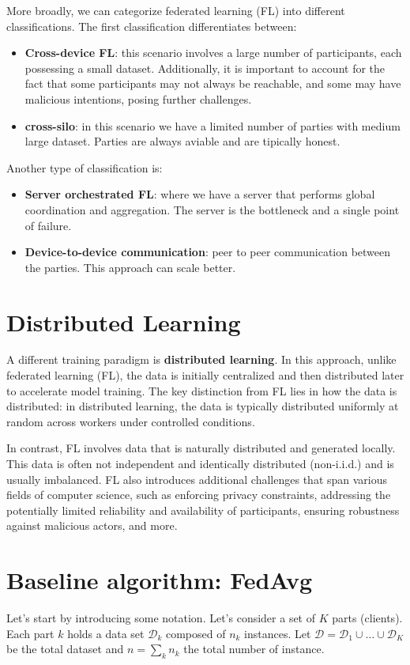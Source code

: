 More broadly, we can categorize federated learning (FL) into different classifications. The first classification
differentiates between:
\begin{itemize}
    \item \textbf{Cross-device FL}: this scenario involves a large number of participants, each possessing a small
        dataset. Additionally, it is important to account for the fact that some participants may not always be 
        reachable, and some may have malicious intentions, posing further challenges.
    \item \textbf{cross-silo}: in this scenario we have a limited number of parties with medium large dataset. Parties are always
        aviable and are tipically honest.
\end{itemize}

Another type of classification is:
\begin{itemize}
    \item \textbf{Server orchestrated FL}: where we have a server that performs global coordination and aggregation. The 
        server is the bottleneck and a single point of failure.
    \item \textbf{Device-to-device communication}: peer to peer communication between the parties. This approach can 
        scale better. 
\end{itemize}

\section{Distributed Learning}
A different training paradigm is \textbf{distributed learning}. In this approach, unlike federated learning (FL), the
data is initially centralized and then distributed later to accelerate model training. The key distinction from FL 
lies in how the data is distributed: in distributed learning, the data is typically distributed uniformly at random
across workers under controlled conditions.

In contrast, FL involves data that is naturally distributed and generated locally. This data is often not independent 
and identically distributed (non-i.i.d.) and is usually imbalanced. FL also introduces additional challenges that 
span various fields of computer science, such as enforcing privacy constraints, addressing the potentially limited 
reliability and availability of participants, ensuring robustness against malicious actors, and more.
\section{Baseline algorithm: FedAvg}
Let's start by introducing some notation. Let’s consider a set of $K$ parts (clients). Each part $k$ holds a data set 
$\mathcal{D}_k$ composed of $n_k$ instances. Let $\mathcal{D} = \mathcal{D}_1 \cup \dots \cup \mathcal{D}_K$ be the total 
dataset and $n = \sum_k n_k$ the total number of instance.

